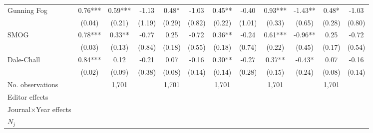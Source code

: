 \begin{sidewaystable}
\begin{threeparttable}
\begin{tabular}{p{3cm}S@{}S@{}S@{}S@{}S@{}S@{}S@{}S@{}S@{}S@{}S@{}}
            Gunning Fog                   &        0.76***&        0.59***&       -1.13   &        0.48*  &       -1.03   &        0.45** &       -0.40   &        0.93***&       -1.43** &        0.48*  &       -1.03   \\
                                          &      (0.04)   &      (0.21)   &      (1.19)   &      (0.29)   &      (0.82)   &      (0.22)   &      (1.01)   &      (0.33)   &      (0.65)   &      (0.28)   &      (0.80)   \\
            SMOG                          &        0.78***&        0.33** &       -0.77   &        0.25   &       -0.72   &        0.36** &       -0.24   &        0.61***&       -0.96** &        0.25   &       -0.72   \\
                                          &      (0.03)   &      (0.13)   &      (0.84)   &      (0.18)   &      (0.55)   &      (0.18)   &      (0.74)   &      (0.22)   &      (0.45)   &      (0.17)   &      (0.54)   \\
            Dale-Chall                    &        0.84***&        0.12   &       -0.21   &        0.07   &       -0.16   &        0.30** &       -0.27   &        0.37** &       -0.43*  &        0.07   &       -0.16   \\
                                          &      (0.02)   &      (0.09)   &      (0.38)   &      (0.08)   &      (0.14)   &      (0.14)   &      (0.28)   &      (0.15)   &      (0.24)   &      (0.08)   &      (0.14)   \\
            \midrule
            No. observations              &               &       1,701   &               &       1,701   &               &       1,701   &               &       1,701   &               &       1,701   &               \\
            \midrule
            Editor effects       &               &           {}   &               &           {}   &               &           {}   &               &           {}   &               &               &               \\
            Journal\(\times\)Year effects          &               &           {}   &               &           {}   &               &           {}   &               &           {}   &               &               &               \\
            \(N_j\)                       &               &           {}   &               &           {}   &               &           {}   &               &           {}   &               &               &               \\

\end{tabular}
\end{threeparttable}
\end{sidewaystable}
